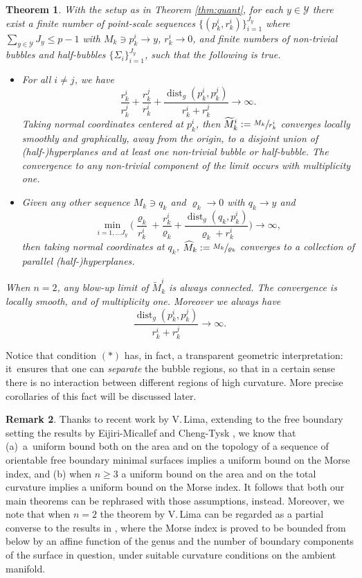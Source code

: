 \documentclass[JEP,XML,SOM,Unicode]{cedram}
\let\mathcal\mathscr
\DeclareMathOperator{\dist}{dist}
\newtheorem{thm}{Theorem}
\theoremstyle{definition}
\newtheorem{rmk}[thm]{Remark}
\begin{document}
\begin{thm}\label{thm:bubbles}
With the setup as in Theorem \ref{thm:quant}, for each $y\in \mathcal{Y}$ there exist a \hbox{finite} number of point-scale sequences $\{(p^i_k, r^i_k)\}_{i=1}^{J_y}$ where $\sum_{y\in \mathcal{Y}} J_y \leq p-1$ with \hbox{$M_k \ni p^i_k \to y$}, $r^i_k\to 0$, and finite numbers of non-trivial bubbles and half-bubbles $\{\Sigma_i\}_{i=1}^{J_y}$, such that the following is true.
\begin{itemize}
\item For all $i\neq j$, we have
\begin{equation*}
\frac{r^i_k}{r^j_k} + \frac{r^j_k}{r^i_k} + \frac{\dist_g(p^i_k, p^j_k)}{r^i_k + r^j_k} \to \infty.
\end{equation*}
Taking normal coordinates centered at $p^i_k$, then $\widetilde{M}^i_k:=\sfrac{M_k}{r^i_k}$ converges \hbox{locally} smoothly and graphically, away from the origin, to a disjoint union of \hbox{(half-)}hyper\-planes and at least one non-trivial bubble or half-bubble. The convergence to any non-trivial component of the limit occurs with multiplicity one.
\item Given any other sequence $M_k \ni q_k$ and $\varrho_k \to 0$ with $q_k \to y$ and
\begin{equation*}
\min_{i=1,\dots J_y} \Big(\frac{\varrho_k}{r^i_k} + \frac{r^i_k}{\varrho_k} + \frac{\dist_g(q_k,p^i_k)}{\varrho_k + r^i_k}\Big)\to \infty,
\end{equation*}
then taking normal coordinates at $q_k$, $\widehat{M}_k:= \sfrac{M_k}{\varrho_k}$ converges to a collection of parallel (half-)hyperplanes.
\end{itemize}
When $n=2$, any blow-up limit of $\widetilde{M}^i_k$ is always connected. The convergence is locally smooth, and of multiplicity one. Moreover we always have
\[
\tag{$*$}
\frac{\dist_g(p^i_k,p^j_k)}{r^i_k + r^j_k}\to \infty .
\]
\end{thm}
Notice that condition $(*)$ has, in fact, a transparent geometric interpretation: it~ensures that one can \emph{separate} the bubble regions, so that in a certain sense there is no interaction between different regions of high curvature. More precise corollaries of this fact will be discussed later.

\begin{rmk}\label{rem:lima}
Thanks to recent work \cite{Lim17} by V.\,Lima, extending to the free boundary setting the results by Eijiri-Micallef \cite{EM08} and Cheng-Tysk \cite{CT94}, we know that (a)~a~uniform bound both on the area and on the topology of a sequence of orientable free boundary minimal surfaces implies a uniform bound on the Morse index, and (b) when $n\geq 3$ a uniform bound on the area and on the total curvature implies a uniform bound on the Morse index. It follows that both our main theorems can be rephrased with those assumptions, instead. Moreover, we note that when $n=2$ the theorem by V.\,Lima can be regarded as a partial converse to the results in \cite{ACS18b}, where the Morse index is proved to be bounded from below by an affine function of the genus and the number of boundary components of the surface in question, under suitable curvature conditions on the ambient manifold.
\end{rmk}
\end{document}
